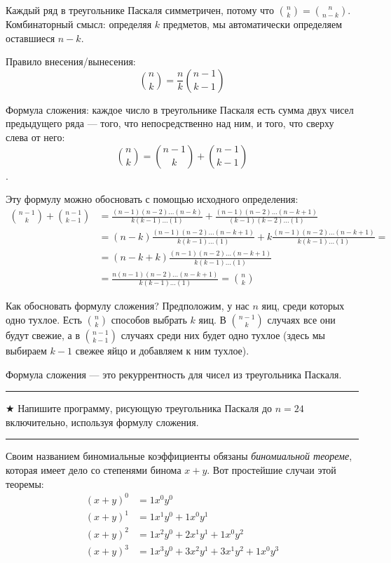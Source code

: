 \documentclass[14pt]{book}
\newenvironment{task}
 { \vspace{2ex}\hrule\vspace{2ex}$\bigstar$ }
 { \vspace{2ex}\hrule\vspace{2ex} }
\begin{document}
Каждый ряд в треугольнике Паскаля симметричен, потому что $\binom{n}{k}=\binom{n}{n-k}$.
Комбинаторный смысл: определяя $k$ предметов, мы автоматически определяем оставшиеся $n-k$.

Правило внесения/вынесения:
$$\binom{n}{k} = \frac{n}{k}\binom{n-1}{k-1}$$

Формула сложения: каждое число в треугольнике Паскаля есть сумма двух чисел предыдущего ряда ---
того, что непосредственно над ним, и того, что сверху слева от него:
$$\binom{n}{k} = \binom{n-1}{k} + \binom{n-1}{k-1}$$.

Эту формулу можно обосновать с помощью исходного определения:
\begin{align*}
  \binom{n-1}{k} + \binom{n-1}{k-1} 
  &= \frac{(n-1)(n-2)\ldots(n-k)}{k(k-1)\ldots(1)} 
     + \frac{(n-1)(n-2)\ldots(n-k+1)}{(k-1)(k-2)\ldots(1)}  \\
  &= (n-k)\frac{(n-1)(n-2)\ldots(n-k+1)}{k(k-1)\ldots(1)} 
     + k\frac{(n-1)(n-2)\ldots(n-k+1)}{k(k-1)\ldots(1)} = \\
  &= (n-k+k)\frac{(n-1)(n-2)\ldots(n-k+1)}{k(k-1)\ldots(1)} \\
  &= \frac{n(n-1)(n-2)\ldots(n-k+1)}{k(k-1)\ldots(1)} = \binom{n}{k}
\end{align*}

Как обосновать формулу сложения? Предположим, у нас $n$ яиц, среди которых
одно тухлое. Есть $\binom{n}{k}$ способов выбрать $k$ яиц. В $\binom{n-1}{k}$
случаях все они будут свежие, а в $\binom{n-1}{k-1}$ случаях среди них будет
одно тухлое (здесь мы выбираем $k-1$ свежее яйцо и добавляем к ним тухлое).

Формула сложения --- это рекуррентность для чисел из треугольника Паскаля.

\begin{task}
Напишите программу, рисующую треугольника Паскаля до $n=24$ включительно,
используя формулу сложения.
\end{task}

Своим названием биномиальные коэффициенты обязаны \emph{биномиальной теореме}, которая
имеет дело со степенями бинома $x+y$. Вот простейшие случаи этой теоремы:
\begin{align*}
(x+y)^0 &= 1x^0y^0 \\
(x+y)^1 &= 1x^1y^0 + 1x^0y^1 \\
(x+y)^2 &= 1x^2y^0 + 2x^1y^1 + 1x^0y^2 \\
(x+y)^3 &= 1x^3y^0 + 3x^2y^1 + 3x^1y^2 + 1x^0y^3
\end{align*}
\end{document}
